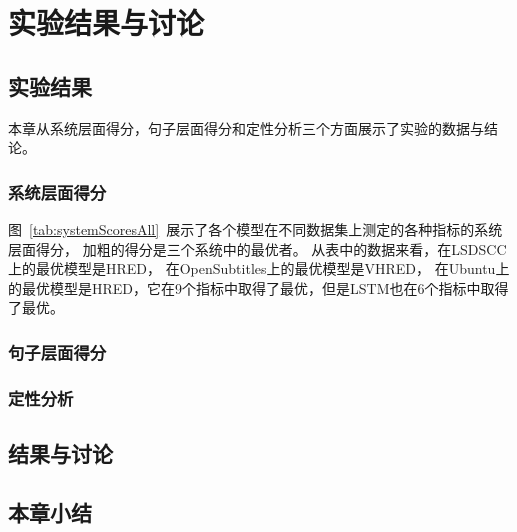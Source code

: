 
\chapter{实验结果与讨论}\label{ch:experiment}

\section{实验结果}\label{sec:experiment_result}
本章从系统层面得分，句子层面得分和定性分析三个方面展示了实验的数据与结论。

\subsection{系统层面得分}\label{subsec:system_scores}
图~\ref{tab:systemScoresAll}~展示了各个模型在不同数据集上测定的各种指标的系统层面得分，
加粗的得分是三个系统中的最优者。
从表中的数据来看，在LSDSCC上的最优模型是HRED，
在OpenSubtitles上的最优模型是VHRED，
在Ubuntu上的最优模型是HRED，它在9个指标中取得了最优，但是LSTM也在6个指标中取得了最优。



\subsection{句子层面得分}\label{subsec:utterance_scores}

\subsection{定性分析}\label{subsec:qualitative_analysis}

\section{结果与讨论}\label{sec:result_and_discussion}

\section{本章小结}\label{sec:experiment_conclusion}
